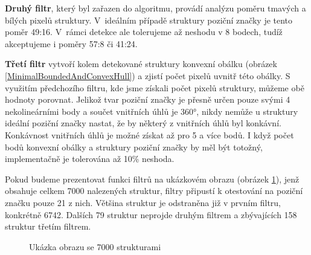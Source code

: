 \textbf{Druhý filtr}, který byl zařazen do algoritmu, provádí analýzu poměru
tmavých a bílých pixelů struktury. V~ideálním případě struktury poziční značky
je tento poměr 49:16. V~rámci detekce ale tolerujeme až neshodu v 8 bodech,
tudíž akceptujeme i poměry 57:8 či 41:24.

\textbf{Třetí filtr} vytvoří kolem detekované struktury konvexní obálku (obrázek
\ref{MinimalBoundedAndConvexHull}) a zjistí počet pixelů uvnitř této obálky. S
využitím předchozího filtru, kde jsme získali počet pixelů struktury, můžeme obě hodnoty porovnat. Jelikož tvar
poziční značky je přesně určen pouze svými 4 nekolineárními body a součet
vnitřních úhlů je 360°, nikdy nemůže u struktury ideální poziční značky nastat,
že by některý z vnitřních úhlů byl konkávní. Konkávnost vnitřních úhlů je možné
získat až pro 5 a více bodů. I když počet bodů konvexní obálky a struktury
poziční značky by měl být totožný, implementačně je tolerována až 10\% neshoda.

Pokud budeme prezentovat funkci filtrů na ukázkovém obrazu (obrázek
\ref{SevenThousandsStructures}), jenž obsahuje celkem 7000 nalezených struktur, filtry připustí k otestování na
poziční značku pouze 21 z nich. Většina struktur je odstraněna již v prvním
filtru, konkrétně 6742. Dalších 79 struktur neprojde druhým filtrem a
zbývajících 158 struktur třetím filtrem.  

\begin{figure}[H]
  \begin{center}
    \caption{Ukázka obrazu se 7000 strukturami}
    \label{SevenThousandsStructures}
  \end{center}
\end{figure}

